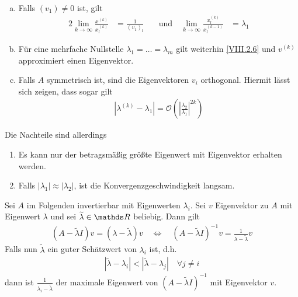 \begin{Beme}~
  \begin{enumerate}[a)]
  \item Falls $(v_1)\neq 0$ ist, gilt
    \begin{alignat}{2}
      \lim_{k\to\infty} \frac{x^{(k)}}{x_l^{(k)}}
      &= \frac{1}{(v_1)_l}\quad
      &\text{und}\quad\lim_{k\to\infty}\frac{x_l^{(k)}}{x_l^{(k-1)}}
      &=\lambda_1
      \label{VIII.2.6}
    \end{alignat}
  \item Für eine mehrfache Nullstelle $\lambda_1=\ldots=\lambda_m$
    gilt weiterhin \eqref{VIII.2.6} und
    $v^{(k)}$ approximiert einen Eigenvektor.
  \item Falls $A$ symmetrisch ist,
    sind die Eigenvektoren $v_i$ orthogonal.
    Hiermit lässt sich zeigen, dass sogar gilt
    \begin{gather*}
      \left|\lambda^{(k)}-\lambda_1\right|
      = \mathcal{O}\left(\left|
        \frac{\lambda_2}{\lambda_1}
        \right|^{2k}\right)
    \end{gather*}
  \end{enumerate}
Die Nachteile sind allerdings
\begin{enumerate}[1)]
\item Es kann nur der betragsmäßig größte Eigenwert
  mit Eigenvektor erhalten werden.
\item Falls $|\lambda_1|\approx|\lambda_2|$,
  ist die Konvergenzgeschwindigkeit langsam.
\end{enumerate}
\end{Beme}


Sei $A$ im Folgenden invertierbar mit Eigenwerten $\lambda_i$.
Sei $v$ Eigenvektor zu $A$ mit Eigenwert $\lambda$ und
sei $\widetilde{ \lambda}\in\R$ beliebig. Dann gilt
\begin{gather*}
  (A-\widetilde{\lambda}I) v= (\lambda-\widetilde{\lambda})v
  \quad\Leftrightarrow\quad
  (A-\widetilde{\lambda}I)^{-1}v=
  \frac{1}{\lambda-\widetilde{\lambda}}v
\end{gather*}
Falls nun $\widetilde{\lambda}$ ein guter Schätzwert
von $\lambda_i$ ist, d.h.
\begin{gather*}
  |\widetilde{\lambda}-\lambda_i|<|\widetilde{\lambda}-\lambda_j|
  \quad \forall j\neq i
\end{gather*}
dann ist $\frac{1}{\lambda_i-\widetilde{\lambda}}$ 
der maximale Eigenwert von $(A-\widetilde{\lambda}I)^{-1}$
mit Eigenvektor $v$.

